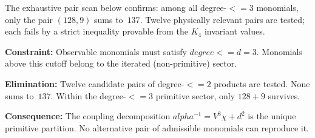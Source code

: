 \documentclass[11pt,a4paper]{book}
\def\alpha{alpha}%
\def\leq{<=}%
\def\text#1{#1}%
\begin{document}
The exhaustive pair scan below confirms: among all degree-$\leq 3$
monomials, only the pair $(128, 9)$ sums to~$137$.  Twelve physically
relevant pairs are tested; each fails by a strict inequality provable
from the $K_4$ invariant values.

\textbf{Constraint:}
Observable monomials must satisfy $\text{degree} \leq d = 3$.
Monomials above this cutoff belong to the iterated (non-primitive)
sector.

\textbf{Elimination:}
Twelve candidate pairs of degree-$\leq 2$ products are tested.
None sums to~$137$.  Within the degree-$\leq 3$ primitive sector,
only $128 + 9$ survives.

\textbf{Consequence:}
The coupling decomposition $\alpha^{-1} = V^3 \chi + d^2$ is the
unique primitive partition.  No alternative pair of admissible
monomials can reproduce it.
\end{document}
